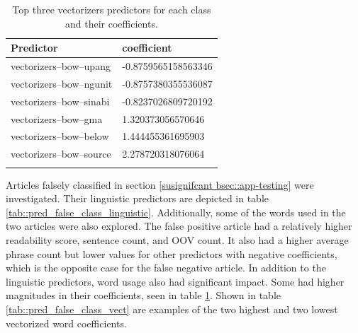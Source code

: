 \begin{table}
    \begin{tabularx}{\textwidth}{|l|l|}
        \hline
        Predictor & coefficient \\ 
        \hline
        \rowcolor{LightRed}
        vectorizers--bow--upang & -0.8759565158563346\\
        \hline
        \rowcolor{LightRed}
        vectorizers--bow--ngunit & -0.8757380355536087\\
        \hline
        \rowcolor{LightRed}
        vectorizers--bow--sinabi & -0.8237026809720192\\
        \hline
        \rowcolor{LightGreen}
        vectorizers--bow--gma & 1.320373056570646\\
        \hline
        \rowcolor{LightGreen}
        vectorizers--bow--below & 1.444455361695903\\
        \hline
        \rowcolor{LightGreen}
        vectorizers--bow--source & 2.278720318076064\\
        \hline
    \caption{Top three vectorizers predictors for each class and their coefficients.}
    \label{tab::vec_coef}
    \end{tabularx}
\end{table}

Articles falsely classified in section \ref{susignifcant bsec::app-testing} were investigated. Their linguistic predictors are depicted in table \ref{tab::pred_false_class_linguistic}. Additionally, some of the words used in the two articles were also explored. The false positive article had a relatively higher readability score, sentence count, and OOV count. It also had a higher average phrase count but lower values for other predictors with negative coefficients, which is the opposite case for the false negative article. In addition to the linguistic predictors, word usage also had significant impact. Some had higher magnitudes in their coefficients, seen in table \ref{tab::vec_coef}. Shown in table \ref{tab::pred_false_class_vect} are examples of the two highest and two lowest vectorized word coefficients.

